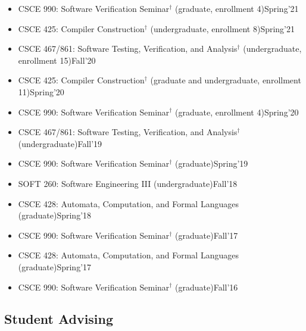 \documentclass[11pt]{article}
\newcommand{\beforegmu}{\begin{center}\rule{2in}{0.8pt}~\textbf{Before GMU}~\rule{2in}{0.8pt}\end{center}}
\begin{document}

\begin{itemize}
    \item CSCE 990: Software Verification Seminar$^{\dagger}$ (graduate, enrollment 4)\hfill Spring'21
    \item CSCE 425: Compiler Construction$^{\dagger}$ (undergraduate, enrollment 8)\hfill Spring'21
    \item CSCE 467/861: Software Testing, Verification, and Analysis$^{\dagger}$ (undergraduate, enrollment 15)\hfill Fall'20
    \item CSCE 425: Compiler Construction$^{\dagger}$ (graduate and undergraduate, enrollment 11)\hfill Spring'20
    \item CSCE 990: Software Verification Seminar$^{\dagger}$ (graduate, enrollment 4)\hfill Spring'20
    \item CSCE 467/861: Software Testing, Verification, and Analysis$^{\dagger}$ (undergraduate)\hfill Fall'19
    \item CSCE 990: Software Verification Seminar$^{\dagger}$ (graduate)\hfill Spring'19
    \item SOFT 260: Software Engineering III (undergraduate)\hfill Fall'18
    \item CSCE 428: Automata, Computation, and Formal Languages (graduate)\hfill Spring'18
    \item CSCE 990: Software Verification Seminar$^{\dagger}$ (graduate)\hfill Fall'17
    \item CSCE 428: Automata, Computation, and Formal Languages (graduate)\hfill Spring'17
    \item CSCE 990: Software Verification Seminar$^{\dagger}$ (graduate)\hfill Fall'16
\end{itemize}





\subsection{Student Advising}

\newcommand{\linhan}{
\item Linhan Li (PhD student)\hfill Spring 2021--present
\begin{description}[before=\small]
    \item \textbf{Outstanding Teaching Assistant Award}, GMU\hfill Fall 2024
    \item Co-author of~\ref{li2025cooler}
\end{description}
}
\end{document}
